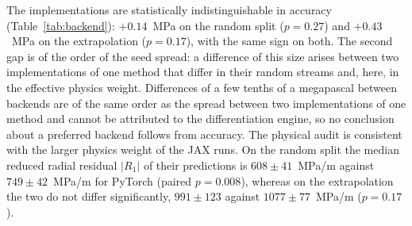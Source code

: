 The implementations are statistically indistinguishable in accuracy (Table~\ref{tab:backend}): $+0.14$~MPa on the random split ($p=0.27$) and $+0.43$~MPa on the extrapolation ($p=0.17$), with the same sign on both. The second gap is of the order of the seed spread: a difference of this size arises between two implementations of one method that differ in their random streams and, here, in the effective physics weight. %
Differences of a few tenths of a megapascal between backends are of the same order as the
spread between two implementations of one method and cannot be attributed to the differentiation
engine, so no conclusion about a preferred backend follows from accuracy.
The physical audit is consistent with the larger physics weight of the JAX runs. On the random split the median reduced radial residual $|R_1|$ of their predictions is $608\pm41$~MPa/m against $749\pm42$~MPa/m for PyTorch (paired $p=0.008$), whereas on the extrapolation the two do not differ significantly, $991\pm123$ against $1077\pm77$~MPa/m ($p=0.17$).
